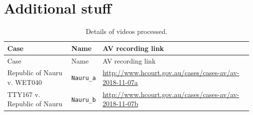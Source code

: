 \documentclass{monashthesis}
\begin{document}
\hypertarget{additional-stuff}{%
\chapter{Additional stuff}\label{additional-stuff}}

\begin{longtable}[]{@{}lll@{}}
\caption{Details of videos processed.}\tabularnewline
\toprule
\begin{minipage}[b]{0.42\columnwidth}\raggedright
Case\strut
\end{minipage} & \begin{minipage}[b]{0.14\columnwidth}\raggedright
Name\strut
\end{minipage} & \begin{minipage}[b]{0.35\columnwidth}\raggedright
AV recording link\strut
\end{minipage}\tabularnewline
\midrule
\endfirsthead
\toprule
\begin{minipage}[b]{0.42\columnwidth}\raggedright
Case\strut
\end{minipage} & \begin{minipage}[b]{0.14\columnwidth}\raggedright
Name\strut
\end{minipage} & \begin{minipage}[b]{0.35\columnwidth}\raggedright
AV recording link\strut
\end{minipage}\tabularnewline
\midrule
\endhead
\begin{minipage}[t]{0.42\columnwidth}\raggedright
Republic of Nauru v. WET040\strut
\end{minipage} & \begin{minipage}[t]{0.14\columnwidth}\raggedright
\texttt{Nauru\_a}\strut
\end{minipage} & \begin{minipage}[t]{0.35\columnwidth}\raggedright
\url{http://www.hcourt.gov.au/cases/cases-av/av-2018-11-07a}\strut
\end{minipage}\tabularnewline
\begin{minipage}[t]{0.42\columnwidth}\raggedright
TTY167 v. Republic of Nauru\strut
\end{minipage} & \begin{minipage}[t]{0.14\columnwidth}\raggedright
\texttt{Nauru\_b}\strut
\end{minipage} & \begin{minipage}[t]{0.35\columnwidth}\raggedright
\url{http://www.hcourt.gov.au/cases/cases-av/av-2018-11-07b}\strut
\end{minipage}\tabularnewline

\end{longtable}
\end{document}
